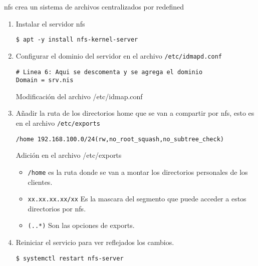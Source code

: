 \documentclass[../main.tex]{subfiles}
\begin{document}
\Gls{nfs} crea un sistema de archivos centralizados por redefined
\begin{enumerate}
  \item Instalar el servidor nfs

        \begin{listing}[H]
\begin{verbatim}
$ apt -y install nfs-kernel-server
\end{verbatim}
\end{listing}

  \item Configurar el dominio del servidor en el
        archivo \texttt{/etc/idmapd.conf}

        \begin{listing}[H]
\begin{verbatim}
# Linea 6: Aqui se descomenta y se agrega el dominio
Domain = srv.nis
\end{verbatim}
    \caption{Modificación del archivo /etc/idmap.conf}
    \label{listing:idmapd}
\end{listing}

  \item Añadir la ruta de los directorios home que se van a
        compartir por \Gls{nfs}, esto es en el archivo \texttt{/etc/exports}

        \begin{listing}[H]
\begin{verbatim}
/home 192.168.100.0/24(rw,no_root_squash,no_subtree_check) 
\end{verbatim}
    \caption{Adición en el archivo /etc/exports}
    \label{listing:exports}
\end{listing}

        \begin{itemize}
          \item \texttt{/home} es la ruta donde se van a montar
                los directorios personales de los clientes.
          \item \texttt{xx.xx.xx.xx/xx} Es la mascara del segmento que
                puede acceder a estos directorios por \Gls{nfs}.\@
          \item \texttt{(..*)} Son las opciones de exports.
        \end{itemize}


  \item Reiniciar el servicio para ver reflejados los cambios.

        \begin{listing}[H]
\begin{verbatim}
$ systemctl restart nfs-server
\end{verbatim}
\end{listing}

\end{enumerate}
\end{document}

